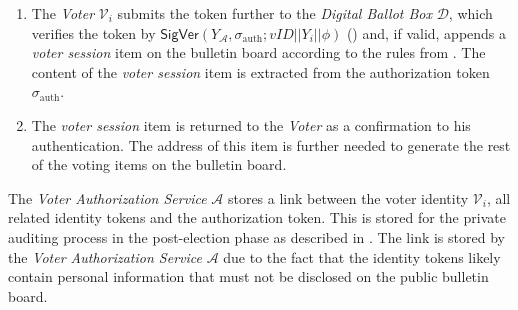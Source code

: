 \begin{enumerate}
    \item The \textit{Voter} $\mathcal{V}_i$ submits the token further to the \textit{Digital Ballot Box} $\mathcal{D}$, which verifies the token by $\mathsf{SigVer} (Y_\mathcal{A}, \sigma_\mathrm{auth}; vID || Y_i || \phi)$ () and, if valid, appends a \textit{voter session} item on the bulletin board according to the rules from . The content of the \textit{voter session} item is extracted from the authorization token $\sigma_\mathrm{auth}$.
    
    \item The \textit{voter session} item is returned to the \textit{Voter} as a confirmation to his authentication. The address of this item is further needed to generate the rest of the voting items on the bulletin board.
\end{enumerate}

The \textit{Voter Authorization Service} $\mathcal{A}$ stores a link between the voter identity $\mathcal{V}_i$, all related identity tokens and the authorization token. This is stored for the private auditing process in the post-election phase as described in . The link is stored by the \textit{Voter Authorization Service} $\mathcal{A}$ due to the fact that the identity tokens likely contain personal information that must not be disclosed on the public bulletin board.

